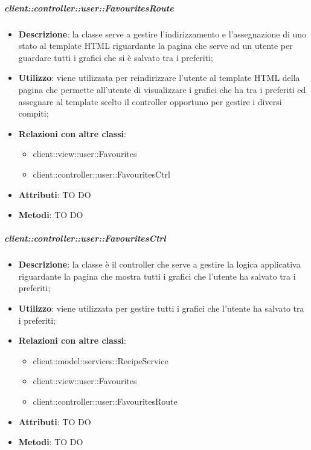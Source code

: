 		\subparagraph{client::controller::user::FavouritesRoute} %
		\label{subp:bdsm_app_client_controller_user_favouritesroute}
			\begin{itemize}
				\item \textbf{Descrizione}: la classe serve a gestire l'indirizzamento e l'assegnazione di uno stato al template HTML riguardante la pagina che serve ad un utente per guardare tutti i grafici che si è salvato tra i preferiti;
				\item \textbf{Utilizzo}: viene utilizzata per reindirizzare l'utente al template HTML della pagina che permette all'utente di visualizzare i grafici che ha tra i preferiti ed assegnare al template scelto il controller opportuno per gestire i diversi compiti;
				\item \textbf{Relazioni con altre classi}:
					\begin{itemize}
						\item client::view::user::Favourites
						\item client::controller::user::FavouritesCtrl
					\end{itemize}
				\item \textbf{Attributi}: TO DO
				\item \textbf{Metodi}: TO DO
			\end{itemize}


		\subparagraph{client::controller::user::FavouritesCtrl} %
		\label{subp:client_controller_user_favouritesctrl}
			\begin{itemize}
				\item \textbf{Descrizione}: la classe è il controller che serve a gestire la logica applicativa riguardante la pagina che mostra tutti i grafici che l'utente ha salvato tra i preferiti;
				\item \textbf{Utilizzo}: viene utilizzata per gestire tutti i grafici che l'utente ha salvato tra i preferiti;
				\item \textbf{Relazioni con altre classi}:
					\begin{itemize}
						\item client::model::services::RecipeService
						\item client::view::user::Favourites
						\item client::controller::user::FavouritesRoute
					\end{itemize}
				\item \textbf{Attributi}: TO DO
				\item \textbf{Metodi}: TO DO
			\end{itemize}

